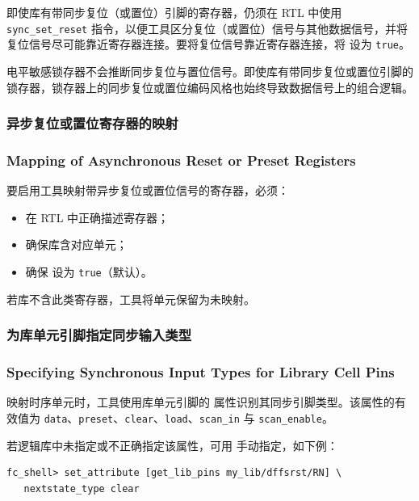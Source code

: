 即使库有带同步复位（或置位）引脚的寄存器，仍须在 RTL 中使用 \texttt{sync\_set\_reset} 指令，以便工具区分复位（或置位）信号与其他数据信号，并将复位信号尽可能靠近寄存器连接。要将复位信号靠近寄存器连接，将  设为 \texttt{true}。

\begin{noteBox}
电平敏感锁存器不会推断同步复位与置位信号。即使库有带同步复位或置位引脚的锁存器，锁存器上的同步复位或置位编码风格也始终导致数据信号上的组合逻辑。
\end{noteBox}

\subsubsection{异步复位或置位寄存器的映射}
\subsubsection*{Mapping of Asynchronous Reset or Preset Registers}

要启用工具映射带异步复位或置位信号的寄存器，必须：
\begin{itemize}
  \item 在 RTL 中正确描述寄存器；
  \item 确保库含对应单元；
  \item 确保  设为 \texttt{true}（默认）。
\end{itemize}

若库不含此类寄存器，工具将单元保留为未映射。

\subsubsection{为库单元引脚指定同步输入类型}
\subsubsection*{Specifying Synchronous Input Types for Library Cell Pins}

映射时序单元时，工具使用库单元引脚的  属性识别其同步引脚类型。该属性的有效值为 \texttt{data}、\texttt{preset}、\texttt{clear}、\texttt{load}、\texttt{scan\_in} 与 \texttt{scan\_enable}。

若逻辑库中未指定或不正确指定该属性，可用  手动指定，如下例：
\begin{lstlisting}
fc_shell> set_attribute [get_lib_pins my_lib/dffsrst/RN] \
   nextstate_type clear
\end{lstlisting}

